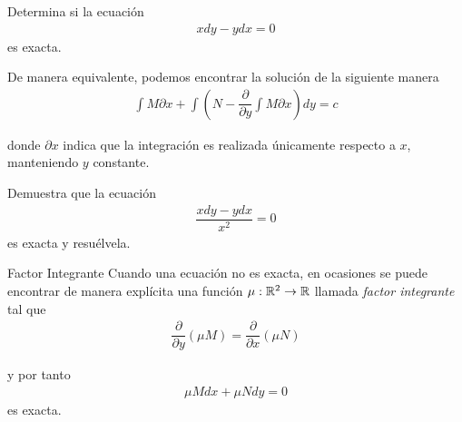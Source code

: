 
	\begin{problema}
		Determina si la ecuación
		\begin{align}
			xdy-ydx=0
		\end{align}
		es exacta.
	\end{problema}

{}
  De manera equivalente, podemos encontrar la solución de la siguiente manera 
  \begin{align}
   \displaystyle \int M\partial x+ \int \left( N - \dfrac{\partial }{\partial y}\int M\partial x \right)dy = c
   \end{align}
   
   donde \emph{$\partial x$} indica que la integración es realizada únicamente respecto a $x$, manteniendo $y$ constante. 


	\begin{problema}
		Demuestra que la ecuación
		\begin{align}
		\dfrac{xdy-ydx}{x^2}=0
		\end{align}
		es exacta y resuélvela. 
	\end{problema}

{Factor Integrante}
  Cuando una ecuación no es exacta, en ocasiones se puede encontrar de manera explícita una función $\mu:\mathbb{R}^{2}\to \mathbb{R}$ llamada \emph{factor integrante} tal que 
\begin{align}
 \dfrac{\partial }{\partial y}\left( \mu M \right) = 
 \dfrac{\partial }{\partial x}\left( \mu N \right)
 \end{align}
 
 y por tanto 
 \begin{align}
  \mu M dx + \mu N dy = 0
  \end{align}
  es exacta.

